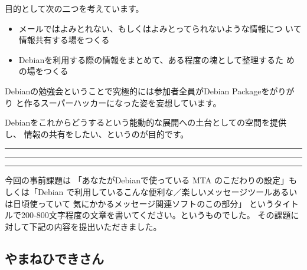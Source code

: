 \documentclass[mingoth,a4paper]{jsarticle}
\begin{document}
 目的として次の二つを考えています。

 \begin{itemize}
 \item メールではよみとれない、もしくはよみとってられないような情報につ
       いて情報共有する場をつくる
 \item Debianを利用する際の情報をまとめて、ある程度の塊として整理するた
       めの場をつくる
 \end{itemize}

 Debianの勉強会ということで究極的には参加者全員がDebian Packageをがりがり
 と作るスーパーハッカーになった姿を妄想しています。

 Debianをこれからどうするという能動的な展開への土台としての空間を提供し、
 情報の共有をしたい、というのが目的です。


\newpage

\begin{minipage}[b]{0.2\hsize}
 \colorbox{dancerlightblue}{}
\end{minipage}
\begin{minipage}[b]{0.8\hsize}
\hrule
\vspace{2mm}
\hrule
\setcounter{tocdepth}{1}
\tableofcontents
\vspace{2mm}
\hrule
\end{minipage}


今回の事前課題は
「あなたがDebianで使っている MTA のこだわりの設定」もしくは「Debian 
で利用しているこんな便利な／楽しいメッセージツールあるいは日頃使っていて
気にかかるメッセージ関連ソフトのこの部分」
というタイトルで200-800文字程度の文章を書いてください。というものでした。
その課題に対して下記の内容を提出いただきました。

\subsection{やまねひできさん}
\end{document}
